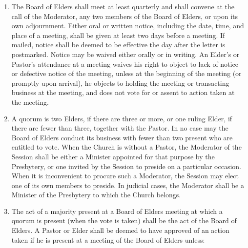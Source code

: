 \documentclass[
]{book}
\begin{document}
\begin{enumerate}
\item
  The Board of Elders shall meet at least quarterly and shall convene at the call of the Moderator, any two members of the Board of Elders, or upon its own adjournment. Either oral or written notice, including the date, time, and place of a meeting, shall be given at least two days before a meeting. If mailed, notice shall be deemed to be effective the day after the letter is postmarked. Notice may be waived either orally or in writing. An Elder's or Pastor's attendance at a meeting waives his right to object to lack of notice or defective notice of the meeting, unless at the beginning of the meeting (or promptly upon arrival), he objects to holding the meeting or transacting business at the meeting, and does not vote for or assent to action taken at the meeting.
\item
  A quorum is two Elders, if there are three or more, or one ruling Elder, if there are fewer than three, together with the Pastor. In no case may the Board of Elders conduct its business with fewer than two present who are entitled to vote. When the Church is without a Pastor, the Moderator of the Session shall be either a Minister appointed for that purpose by the Presbytery, or one invited by the Session to preside on a particular occasion. When it is inconvenient to procure such a Moderator, the Session may elect one of its own members to preside. In judicial cases, the Moderator shall be a Minister of the Presbytery to which the Church belongs.
\item
  The act of a majority present at a Board of Elders meeting at which a quorum is present (when the vote is taken) shall be the act of the Board of Elders. A Pastor or Elder shall be deemed to have approved of an action taken if he is present at a meeting of the Board of Elders unless:


\end{enumerate}
\end{document}
